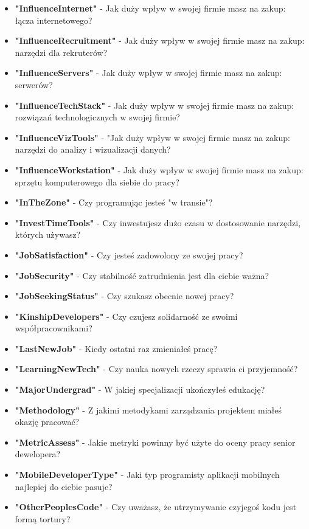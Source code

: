 \begin{appendices}
\begin{itemize}
        \item \textbf{"InfluenceInternet"} - Jak duży wpływ w swojej firmie masz na zakup: łącza internetowego?
        \item \textbf{"InfluenceRecruitment"} - Jak duży wpływ w swojej firmie masz na zakup: narzędzi dla rekruterów?
        \item \textbf{"InfluenceServers"} - Jak duży wpływ w swojej firmie masz na zakup: serwerów?
        \item \textbf{"InfluenceTechStack"} - Jak duży wpływ w swojej firmie masz na zakup: rozwiązań technologicznych w swojej firmie?
        \item \textbf{"InfluenceVizTools"} - "Jak duży wpływ w swojej firmie masz na zakup: narzędzi do analizy i wizualizacji danych?
        \item \textbf{"InfluenceWorkstation"} - Jak duży wpływ w swojej firmie masz na zakup: sprzętu komputerowego dla siebie do pracy?
        \item \textbf{"InTheZone"} - Czy programując jesteś "w transie"?
        \item \textbf{"InvestTimeTools"} - Czy inwestujesz dużo czasu w dostosowanie narzędzi, których używasz?
        \item \textbf{"JobSatisfaction"} - Czy jesteś zadowolony ze swojej pracy?
        \item \textbf{"JobSecurity"} - Czy stabilność zatrudnienia jest dla ciebie ważna?
        \item \textbf{"JobSeekingStatus"} - Czy szukasz obecnie nowej pracy?
        \item \textbf{"KinshipDevelopers"} - Czy czujesz solidarność ze swoimi współpracownikami?
        \item \textbf{"LastNewJob"} - Kiedy ostatni raz zmieniałeś pracę?
        \item \textbf{"LearningNewTech"} - Czy nauka nowych rzeczy sprawia ci przyjemność?
        \item \textbf{"MajorUndergrad"} - W jakiej specjalizacji ukończyłeś edukację?
        \item \textbf{"Methodology"} - Z jakimi metodykami zarządzania projektem miałeś okazję pracować?
        \item \textbf{"MetricAssess"} - Jakie metryki powinny być użyte do oceny pracy senior dewelopera?
        \item \textbf{"MobileDeveloperType"} - Jaki typ programisty aplikacji mobilnych najlepiej do ciebie pasuje?
        \item \textbf{"OtherPeoplesCode"} - Czy uważasz, że utrzymywanie czyjegoś kodu jest formą tortury?

\end{itemize}
\end{appendices}
